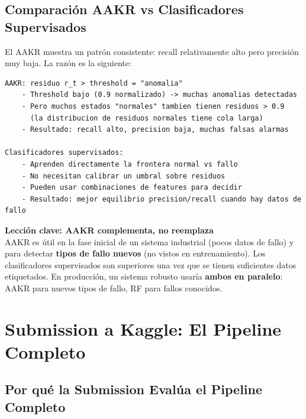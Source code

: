 \documentclass[12pt,a4paper]{article}
\begin{document}
\subsection{Comparaci\'{o}n AAKR vs Clasificadores Supervisados}

El AAKR muestra un patr\'{o}n consistente: recall relativamente alto pero precisi\'{o}n
muy baja. La raz\'{o}n es la siguiente:

\begin{center}
\begin{verbatim}
AAKR: residuo r_t > threshold = "anomalia"
    - Threshold bajo (0.9 normalizado) -> muchas anomalias detectadas
    - Pero muchos estados "normales" tambien tienen residuos > 0.9
      (la distribucion de residuos normales tiene cola larga)
    - Resultado: recall alto, precision baja, muchas falsas alarmas

Clasificadores supervisados:
    - Aprenden directamente la frontera normal vs fallo
    - No necesitan calibrar un umbral sobre residuos
    - Pueden usar combinaciones de features para decidir
    - Resultado: mejor equilibrio precision/recall cuando hay datos de fallo
\end{verbatim}
\end{center}

\begin{claveBox}
\textbf{Lección clave: AAKR complementa, no reemplaza}\\[4pt]
AAKR es \'{u}til en la fase inicial de un sistema industrial (pocos datos de fallo)
y para detectar \textbf{tipos de fallo nuevos} (no vistos en entrenamiento). Los
clasificadores supervisados son superiores una vez que se tienen suficientes datos
etiquetados. En producci\'{o}n, un sistema robusto usar\'{i}a \textbf{ambos en paralelo}:
AAKR para nuevos tipos de fallo, RF para fallos conocidos.
\end{claveBox}

\section{Submission a Kaggle: El Pipeline Completo}

\subsection{Por qu\'{e} la Submission Eval\'{u}a el Pipeline Completo}
\end{document}
